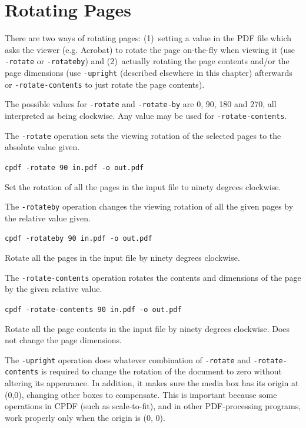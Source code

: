\documentclass{book}
\begin{document}
  \section{Rotating Pages}

There are two ways of rotating pages: (1)~setting a value in the PDF file which
asks the viewer (e.g. Acrobat) to rotate the page on-the-fly when viewing it
(use \texttt{-rotate} or \texttt{-rotateby}) and (2)~actually rotating the page
contents and/or the page dimensions (use \texttt{-upright} (described elsewhere in this chapter) afterwards or
\texttt{-rotate-contents} to just rotate the page contents).

  The possible values for \texttt{-rotate} and \texttt{-rotate-by} are 0, 90,
180 and 270, all interpreted as being clockwise. Any value may be used for
\texttt{-rotate-contents}.
  
The \texttt{-rotate} operation sets the viewing rotation of the selected pages to
the absolute value given.
  \begin{framed}
  \noindent\small\verb!cpdf -rotate 90 in.pdf -o out.pdf!

  \vspace{2.5mm}
  \noindent Set the rotation of all the pages in the input file to ninety degrees clockwise.
  \end{framed}
  \noindent The \texttt{-rotateby} operation changes the viewing rotation of all the
given pages by the relative value given.
  \begin{framed}
  \noindent\small\verb!cpdf -rotateby 90 in.pdf -o out.pdf!

  \vspace{2.5mm}
  \noindent Rotate all the pages in the input file by ninety degrees clockwise.
  \end{framed}
  \noindent The \texttt{-rotate-contents} operation rotates the contents and dimensions
of the page by the given relative value.
  \begin{framed}
  \noindent\small\verb!cpdf -rotate-contents 90 in.pdf -o out.pdf!

  \vspace{2.5mm}

  \noindent Rotate all the page contents in the input file by
ninety degrees clockwise. Does not change the page dimensions.
  \end{framed}

  \label{upright}
   \noindent The \texttt{-upright} operation does whatever combination of
\texttt{-rotate} and \texttt{-rotate-contents} is required to change the
rotation of the document to zero without altering its appearance. In addition, it makes sure the media box has its origin at (0,0), changing other boxes to compensate. This is important because some operations in CPDF (such as scale-to-fit), and in other PDF-processing programs, work properly only when the origin is (0, 0).
\end{document}
